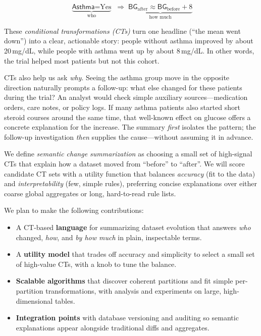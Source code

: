 \documentclass[9pt, twoside, twocolumn]{extarticle}
\begin{document}
\[
\underbrace{\textsf{Asthma}=\text{Yes}}_{\text{who}}
\;\Rightarrow\;
\underbrace{\textsf{BG}_{\text{after}} \approx \textsf{BG}_{\text{before}} + 8}_{\text{how much}}
\]

These \emph{conditional transformations (CTs)} \cite{He_Meliou_Fariha_2024} turn one headline (“the mean went down”) into a clear, actionable story: people without asthma improved by about 20\,mg/dL, while people with asthma went up by about 8\,mg/dL. In other words, the trial helped most patients but not this cohort.

CTs also help us ask \emph{why}. Seeing the asthma group move in the opposite direction naturally prompts a follow-up: what else changed for these patients during the trial? An analyst would check simple auxiliary sources—medication orders, care notes, or policy logs. If many asthma patients also started short steroid courses around the same time, that well-known effect on glucose offers a concrete explanation for the increase. The summary \emph{first} isolates the pattern; the follow-up investigation \emph{then} supplies the cause—without assuming it in advance.

We define \emph{semantic change summarization} as choosing a small set of high-signal CTs that explain how a dataset moved from “before” to “after”. We will score candidate CT sets with a utility function that balances \emph{accuracy} (fit to the data) and \emph{interpretability} (few, simple rules), preferring concise explanations over either coarse global aggregates or long, hard-to-read rule lists.

We plan to make the following contributions:
\begin{itemize}
  \item A CT-based \textbf{language} for summarizing dataset evolution that answers \emph{who} changed, \emph{how}, and \emph{by how much} in plain, inspectable terms.
  \item A \textbf{utility model} that trades off accuracy and simplicity to select a small set of high-value CTs, with a knob to tune the balance.
  \item \textbf{Scalable algorithms} that discover coherent partitions and fit simple per-partition transformations, with analysis and experiments on large, high-dimensional tables.
  \item \textbf{Integration points} with database versioning and auditing so semantic explanations appear alongside traditional diffs and aggregates.
\end{itemize}
\end{document}
